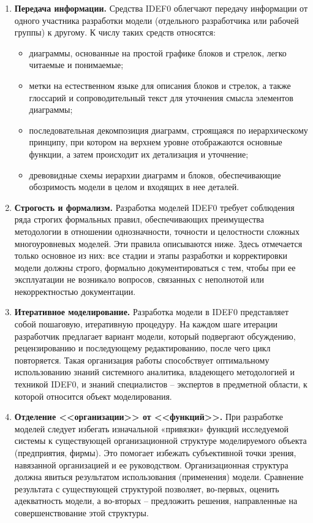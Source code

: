 \documentclass[a4paper, final]{article}
\begin{document}
\begin{enumerate}
  \item \textbf{Передача информации.} Средства IDEF0 облегчают передачу информации от одного участника разработки модели (отдельного разработчика или рабочей группы) к другому. К числу таких средств относятся:
  \begin{itemize}
    \item диаграммы, основанные на простой графике блоков и стрелок, легко читаемые и понимаемые;
    \item метки на естественном языке для описания блоков и стрелок, а также глоссарий и сопроводительный текст для уточнения смысла элементов диаграммы;
    \item последовательная декомпозиция диаграмм, строящаяся по иерархическому принципу, при котором на верхнем уровне отображаются основные функции, а затем происходит их детализация и уточнение;
    \item древовидные схемы иерархии диаграмм и блоков, обеспечивающие обозримость модели в целом и входящих в нее деталей.
  \end{itemize}

  \item \textbf{Строгость и формализм.} Разработка моделей IDEF0 требует соблюдения ряда строгих формальных правил, обеспечивающих преимущества методологии в отношении однозначности, точности и целостности сложных многоуровневых моделей. Эти правила описываются ниже. Здесь отмечается только основное из них: все стадии и этапы разработки и корректировки модели должны строго, формально документироваться с тем, чтобы при ее эксплуатации не возникало вопросов, связанных с неполнотой или некорректностью документации.
  
  \item \textbf{Итеративное моделирование.} Разработка модели в IDEF0 представляет собой пошаговую, итеративную процедуру. На каждом шаге итерации разработчик предлагает вариант модели, который подвергают обсуждению, рецензированию и последующему редактированию, после чего цикл повторяется. Такая организация работы способствует оптимальному использованию знаний системного аналитика, владеющего методологией и техникой IDEF0, и знаний специалистов -- экспертов в предметной области, к которой относится объект моделирования.
  
  \item \textbf{Отделение <<организации>> от <<функций>>.} При разработке моделей следует избегать изначальной «привязки» функций исследуемой системы к существующей организационной структуре моделируемого объекта (предприятия, фирмы). Это помогает избежать субъективной точки зрения, навязанной организацией и ее руководством. Организационная структура должна явиться результатом использования (применения) модели. Сравнение результата с существующей структурой позволяет, во-первых, оценить адекватность модели, а во-вторых -- предложить решения, направленные на совершенствование этой структуры. \cite{bib:gost_idef0}
\end{enumerate}
\end{document}
